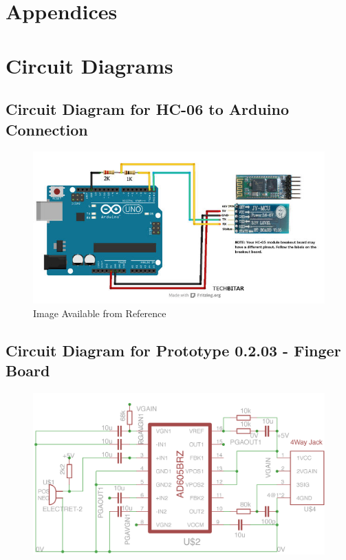 \section{Appendices}
\appendix

\section{Circuit Diagrams} \label{Circuit Diagrams}


\subsection{Circuit Diagram for HC-06 to Arduino Connection}
\label{arduinobluetooth}
\begin{figure}[H]
\centering
\includegraphics[scale = 1]{Images/arduinobluetooth}
\caption*{Image Available from Reference~\cite{arduinobluetooth}}
\end{figure}

\subsection{Circuit Diagram for Prototype 0.2.03 - Finger Board}
\label{fingerboardsch}
\begin{figure}[H]
\centering
\includegraphics[scale = 1]{Images/mic_schematic_01}
\end{figure}

